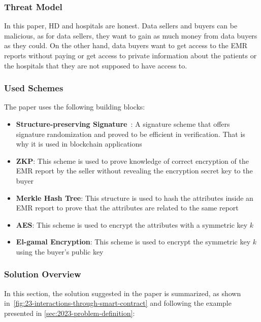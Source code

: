 \subsubsection{Threat Model}
In this paper, HD and hospitals are honest.
Data sellers and buyers can be malicious, as for data sellers, they want to gain as much money from data buyers as they could.
On the other hand, data buyers want to get access to the EMR reports without paying or get access to private information about the patients or the hospitals that they are not supposed to have access to.

\subsubsection{Used Schemes}
The paper uses the following building blocks:

\begin{itemize}
    \item \textbf{Structure-preserving Signature}~\cite{gay2018more}: A signature scheme that offers signature randomization and proved to be efficient in verification. That is why it is used in blockchain applications
    \item \textbf{ZKP}: This scheme is used to prove knowledge of correct encryption of the EMR report by the seller without revealing the encryption secret key to the buyer
    \item \textbf{Merkle Hash Tree}: This structure is used to hash the attributes inside an EMR report to prove that the attributes are related to the same report
    \item \textbf{AES}: This scheme is used to encrypt the attributes with a symmetric key $k$
    \item \textbf{El-gamal Encryption}: This scheme is used to encrypt the symmetric key $k$ using the buyer's public key
\end{itemize}

\subsubsection{Solution Overview}

In this section, the solution suggested in the paper is summarized, as shown in~\cref{fig:23-interactions-through-smart-contract} and following the example presented in \cref{sec:2023-problem-definition}:

